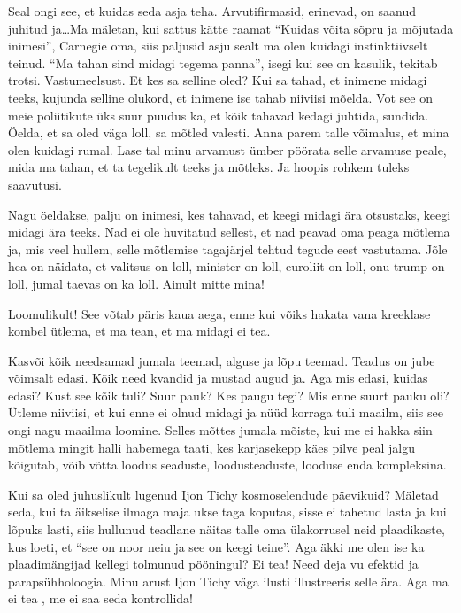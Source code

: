 Seal ongi see, et kuidas seda asja teha. Arvutifirmasid, erinevad, on saanud juhitud ja\ldots Ma mäletan, kui  sattus kätte raamat \enquote{Kuidas võita sõpru ja mõjutada inimesi}, Carnegie oma, siis paljusid asju sealt ma olen kuidagi instinktiivselt teinud. \enquote{Ma tahan sind midagi tegema panna}, isegi kui see on kasulik, tekitab trotsi. Vastumeelsust. Et kes sa selline oled? Kui sa tahad, et inimene midagi teeks, kujunda selline olukord, et inimene ise tahab niiviisi mõelda. Vot see on meie poliitikute üks suur puudus ka, et kõik tahavad kedagi juhtida, sundida. Öelda, et sa oled väga loll, sa mõtled valesti. Anna parem talle võimalus, et mina olen kuidagi rumal. Lase tal minu arvamust ümber pöörata selle arvamuse peale, mida ma tahan, et ta tegelikult teeks ja mõtleks. Ja hoopis rohkem tuleks  saavutusi. 

Nagu öeldakse, palju on inimesi, kes tahavad, et  keegi midagi ära otsustaks, keegi midagi ära teeks. Nad ei ole huvitatud sellest, et nad peavad oma peaga mõtlema ja, mis veel hullem, selle mõtlemise tagajärjel tehtud tegude eest vastutama. Jõle hea on näidata, et valitsus on loll, minister on loll, euroliit on loll, onu trump on loll, jumal taevas on ka loll. Ainult mitte mina!
                 

Loomulikult! See võtab päris kaua aega, enne kui võiks hakata vana kreeklase kombel ütlema, et ma tean, et ma midagi ei tea. 

Kasvõi kõik needsamad jumala teemad, alguse ja lõpu teemad. Teadus on jube võimsalt edasi. Kõik need kvandid ja mustad augud ja. Aga mis edasi, kuidas edasi? Kust see kõik tuli? Suur pauk? Kes paugu tegi? Mis enne suurt pauku oli? Ütleme niiviisi, et kui enne ei olnud midagi ja  nüüd korraga tuli maailm, siis see ongi nagu maailma loomine. Selles mõttes jumala mõiste, kui me ei hakka siin  mõtlema mingit halli habemega taati, kes karjasekepp käes pilve peal jalgu kõigutab, võib võtta loodus seaduste, loodusteaduste, looduse enda kompleksina. 

Kui sa oled juhuslikult lugenud Ijon Tichy kosmoselendude päevikuid? Mäletad seda, kui ta  äikselise ilmaga maja ukse taga koputas, sisse ei tahetud lasta ja kui lõpuks lasti, siis hullunud teadlane näitas talle oma ülakorrusel neid plaadikaste, kus loeti, et \enquote{see on noor neiu ja see on keegi teine}. Aga äkki me olen ise ka plaadimängijad kellegi tolmunud pööningul? Ei tea! Need deja vu efektid ja  parapsühholoogia. Minu arust Ijon Tichy väga ilusti illustreeris selle ära. Aga ma ei tea , me ei saa seda kontrollida! 

